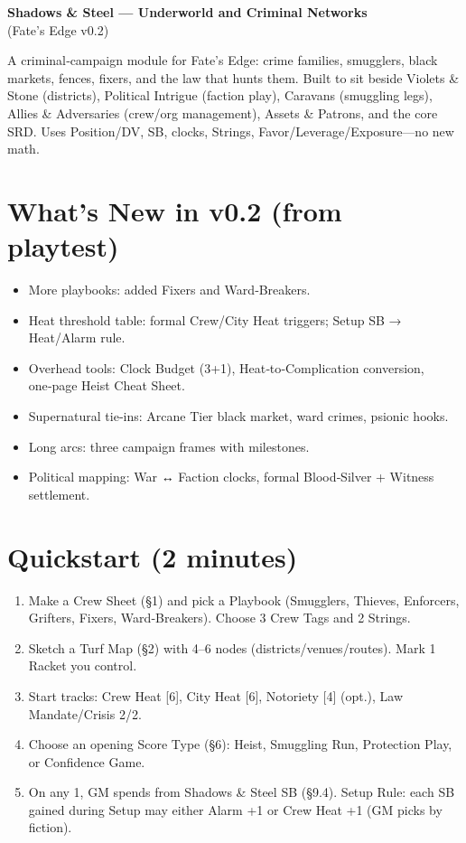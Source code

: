 \documentclass[11pt]{article}
\begin{document}
\begin{center}
{\LARGE \textbf{Shadows \& Steel --- Underworld and Criminal Networks}} \\
{\large (Fate's Edge v0.2)}
\end{center}

\vspace{0.2in}

A criminal‑campaign module for Fate's Edge: crime families, smugglers, black markets, fences, fixers, and the law that hunts them. Built to sit beside Violets \& Stone (districts), Political Intrigue (faction play), Caravans (smuggling legs), Allies \& Adversaries (crew/org management), Assets \& Patrons, and the core SRD. Uses Position/DV, SB, clocks, Strings, Favor/Leverage/Exposure---no new math.

\section*{What's New in v0.2 (from playtest)}
\begin{itemize}
\item More playbooks: added Fixers and Ward‑Breakers.
\item Heat threshold table: formal Crew/City Heat triggers; Setup SB → Heat/Alarm rule.
\item Overhead tools: Clock Budget (3+1), Heat‑to‑Complication conversion, one‑page Heist Cheat Sheet.
\item Supernatural tie‑ins: Arcane Tier black market, ward crimes, psionic hooks.
\item Long arcs: three campaign frames with milestones.
\item Political mapping: War ↔ Faction clocks, formal Blood‑Silver + Witness settlement.
\end{itemize}

\section*{Quickstart (2 minutes)}
\begin{enumerate}
\item Make a Crew Sheet (§1) and pick a Playbook (Smugglers, Thieves, Enforcers, Grifters, Fixers, Ward‑Breakers). Choose 3 Crew Tags and 2 Strings.
\item Sketch a Turf Map (§2) with 4--6 nodes (districts/venues/routes). Mark 1 Racket you control.
\item Start tracks: Crew Heat [6], City Heat [6], Notoriety [4] (opt.), Law Mandate/Crisis 2/2.
\item Choose an opening Score Type (§6): Heist, Smuggling Run, Protection Play, or Confidence Game.
\item On any 1, GM spends from Shadows \& Steel SB (§9.4). Setup Rule: each SB gained during Setup may either Alarm +1 or Crew Heat +1 (GM picks by fiction).
\end{enumerate}
\end{document}
